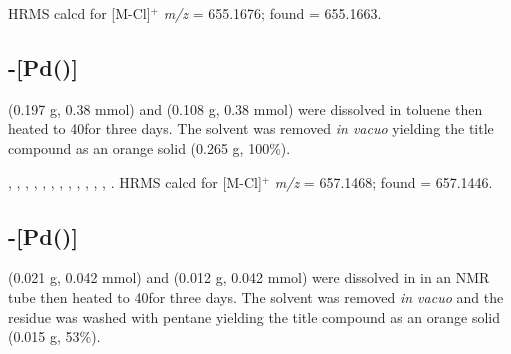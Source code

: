 HRMS calcd for  [M-Cl]$^+$ \emph{m/z} = 655.1676; found = 655.1663.


\subsection*{\trans{}-[Pd(\tButhixantphos)]}


\tBuThixantphos{} (0.197 g, 0.38 mmol) and \ce{[Pd(cod)Cl2]} (0.108 g, 0.38 mmol) were dissolved in toluene then heated to 40\degC for three days.  The solvent was removed \emph{in vacuo} yielding the title compound as an orange solid (0.265 g, 100\%).



,
,
,
,
,
,
,
,
,
,
,
,
.
HRMS calcd for  [M-Cl]$^+$ \emph{m/z} = 657.1468; found = 657.1446.


\subsection*{\trans{}-[Pd(\tBuxantphos)]}

\tBuXantphos{} (0.021 g, 0.042 mmol) and \ce{[Pd(cod)Cl2]} (0.012 g, 0.042 mmol) were dissolved in  in an NMR tube then heated to 40\degC for three days.  The solvent was removed \emph{in vacuo} and the residue was washed with pentane yielding the title compound as an orange solid (0.015 g, 53\%).

